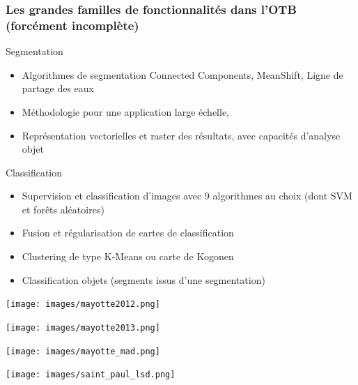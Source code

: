 \documentclass[8pt]{beamer}
\begin{document}
\begin{frame}
\frametitle{Les grandes familles de fonctionnalités dans l'OTB (forcément incomplète)}
\begin{block}{Segmentation}
\begin{itemize}
\item Algorithmes de segmentation Connected Components, MeanShift, Ligne de partage des eaux
\item Méthodologie pour une application large échelle,
\item Représentation vectorielles et raster des résultats, avec capacités d'analyse objet
\end{itemize}
\end{block}

\begin{block}{Classification}
\begin{itemize}
\item Supervision et classification d'images avec 9 algorithmes au choix (dont SVM et forêts aléatoires)
\item Fusion et régularisation de cartes de classification
\item Clustering de type K-Means ou carte de Kogonen
\item Classification objets (segments issus d'une segmentation)
\end{itemize}
\end{block}

\end{frame}

\vspace*{-6.5mm}
\begin{frame}[plain]
\hspace*{-11mm}
    \texttt{[image: images/mayotte2012.png]}
\end{frame}

\vspace*{-6.5mm}
\begin{frame}[plain]
\hspace*{-11mm}
    \texttt{[image: images/mayotte2013.png]}
\end{frame}

\vspace*{-6.5mm}
\begin{frame}[plain]
\hspace*{-11mm}
    \texttt{[image: images/mayotte\_mad.png]}
\end{frame}

\vspace*{-6.5mm}
\begin{frame}[plain]
\hspace*{-11mm}
\texttt{[image: images/saint\_paul\_lsd.png]}
\end{frame}
\end{document}
